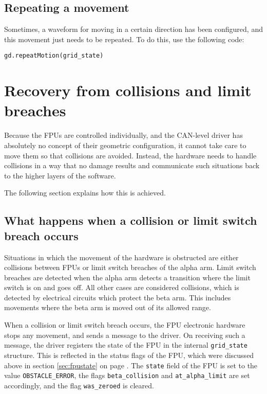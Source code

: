 \documentclass{scrartcl}[12pt,a4paper]
\begin{document}
\subsection{Repeating a movement}

Sometimes, a waveform for moving in a certain direction has been
configured, and this movement just needs to be repeated.  To do this,
use the following code:

\begin{verbatim}
gd.repeatMotion(grid_state)
\end{verbatim}


\section{Recovery from collisions and limit breaches}
\label{sec:recovery}

Because the FPUs are controlled individually, and the CAN-level driver
has absolutely no concept of their geometric configuration, it cannot
take care to move them so that collisions are avoided.  Instead, the
hardware needs to handle collisions in a way that no damage results
and communicate such situations back to the higher layers of the
software.

The following section explains how this is achieved.

\subsection{What happens when a collision or limit switch breach occurs}

Situations in which the movement of the hardware is obstructed
are either collisions between FPUs or limit switch breaches
of the alpha arm. Limit switch breaches are detected
when the alpha arm detects a transition where the
limit switch is on and goes off. All other cases are
considered collisions, which is detected by electrical
circuits which protect the beta arm. This includes
movements where the beta arm is moved out of its
allowed range.

When a collision or limit switch breach occurs, the FPU electronic
hardware stops any movement, and sends a message to the driver. On
receiving such a message, the driver registers the state of the FPU in
the internal \texttt{grid\_state} structure. This is reflected in the
status flags of the FPU, which were discussed above in section
\ref{sec:fpustate} on page \pageref{sec:fpustate}.  The \texttt{state}
field of the FPU is set to the value \texttt{OBSTACLE\_ERROR}, the
flags \texttt{beta\_collision} and \texttt{at\_alpha\_limit} are set
accordingly, and the flag \texttt{was\_zeroed} is cleared.
\end{document}
